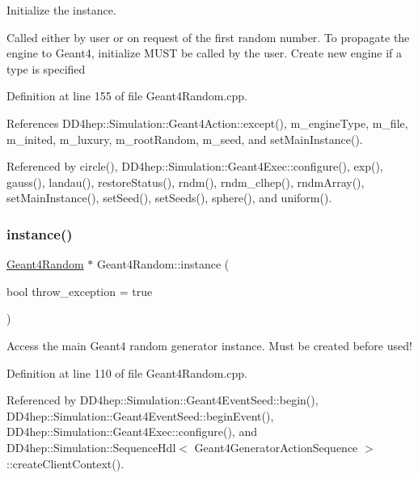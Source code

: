 Initialize the instance. 

Called either by user or on request of the first random number. To propagate the engine to Geant4, initialize M\+U\+ST be called by the user. Create new engine if a type is specified 

Definition at line 155 of file Geant4\+Random.\+cpp.



References D\+D4hep\+::\+Simulation\+::\+Geant4\+Action\+::except(), m\+\_\+engine\+Type, m\+\_\+file, m\+\_\+inited, m\+\_\+luxury, m\+\_\+root\+Random, m\+\_\+seed, and set\+Main\+Instance().



Referenced by circle(), D\+D4hep\+::\+Simulation\+::\+Geant4\+Exec\+::configure(), exp(), gauss(), landau(), restore\+Status(), rndm(), rndm\+\_\+clhep(), rndm\+Array(), set\+Main\+Instance(), set\+Seed(), set\+Seeds(), sphere(), and uniform().

\hypertarget{class_d_d4hep_1_1_simulation_1_1_geant4_random_a76e4bbadf0c58d9f6ee05decdd200fe6}{}\label{class_d_d4hep_1_1_simulation_1_1_geant4_random_a76e4bbadf0c58d9f6ee05decdd200fe6} 
\subsubsection{\texorpdfstring{instance()}{instance()}}
{\footnotesize\ttfamily \hyperlink{class_d_d4hep_1_1_simulation_1_1_geant4_random}{Geant4\+Random} $\ast$ Geant4\+Random\+::instance (\begin{DoxyParamCaption}\item[{bool}]{throw\+\_\+exception = {\ttfamily true} }\end{DoxyParamCaption})\hspace{0.3cm}{\ttfamily [static]}}



Access the main Geant4 random generator instance. Must be created before used! 



Definition at line 110 of file Geant4\+Random.\+cpp.



Referenced by D\+D4hep\+::\+Simulation\+::\+Geant4\+Event\+Seed\+::begin(), D\+D4hep\+::\+Simulation\+::\+Geant4\+Event\+Seed\+::begin\+Event(), D\+D4hep\+::\+Simulation\+::\+Geant4\+Exec\+::configure(), and D\+D4hep\+::\+Simulation\+::\+Sequence\+Hdl$<$ Geant4\+Generator\+Action\+Sequence $>$\+::create\+Client\+Context().

